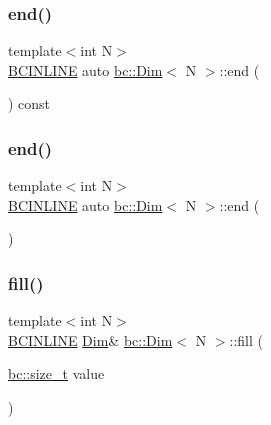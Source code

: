 \mbox{\label{structbc_1_1Dim_ae4ac30383a187b53ca218e7fe15fcc5d}} 
\subsubsection{\texorpdfstring{end()}{end()}\hspace{0.1cm}{\footnotesize\ttfamily [1/2]}}
{\footnotesize\ttfamily template$<$int N$>$ \\
\hyperlink{common_8h_a6699e8b0449da5c0fafb878e59c1d4b1}{B\+C\+I\+N\+L\+I\+NE} auto \hyperlink{structbc_1_1Dim}{bc\+::\+Dim}$<$ N $>$\+::end (\begin{DoxyParamCaption}{ }\end{DoxyParamCaption}) const\hspace{0.3cm}{\ttfamily [inline]}}

\mbox{\label{structbc_1_1Dim_a1b236eb5f815625005ff5aded55b1465}} 
\subsubsection{\texorpdfstring{end()}{end()}\hspace{0.1cm}{\footnotesize\ttfamily [2/2]}}
{\footnotesize\ttfamily template$<$int N$>$ \\
\hyperlink{common_8h_a6699e8b0449da5c0fafb878e59c1d4b1}{B\+C\+I\+N\+L\+I\+NE} auto \hyperlink{structbc_1_1Dim}{bc\+::\+Dim}$<$ N $>$\+::end (\begin{DoxyParamCaption}{ }\end{DoxyParamCaption})\hspace{0.3cm}{\ttfamily [inline]}}

\mbox{\label{structbc_1_1Dim_ad93f3cc2e0ab0d1ee9554d203e89d9fa}} 
\subsubsection{\texorpdfstring{fill()}{fill()}}
{\footnotesize\ttfamily template$<$int N$>$ \\
\hyperlink{common_8h_a6699e8b0449da5c0fafb878e59c1d4b1}{B\+C\+I\+N\+L\+I\+NE} \hyperlink{structbc_1_1Dim}{Dim}\& \hyperlink{structbc_1_1Dim}{bc\+::\+Dim}$<$ N $>$\+::fill (\begin{DoxyParamCaption}\item[{\hyperlink{namespacebc_aaf8e3fbf99b04b1b57c4f80c6f55d3c5}{bc\+::size\+\_\+t}}]{value }\end{DoxyParamCaption})\hspace{0.3cm}{\ttfamily [inline]}}

